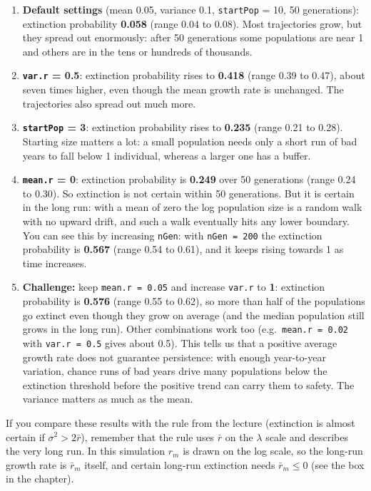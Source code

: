 \documentclass[
  a4paper]{book}
\providecommand{\tightlist}{%
  \setlength{\itemsep}{0pt}\setlength{\parskip}{0pt}}
\begin{document}
\begin{enumerate}
\def\labelenumi{\arabic{enumi}.}
\tightlist
\item
  \textbf{Default settings} (mean 0.05, variance 0.1, \texttt{startPop} = 10, 50 generations): extinction probability \textbf{0.058} (range 0.04 to 0.08). Most trajectories grow, but they spread out enormously: after 50 generations some populations are near 1 and others are in the tens or hundreds of thousands.
\item
  \textbf{\texttt{var.r} = 0.5}: extinction probability rises to \textbf{0.418} (range 0.39 to 0.47), about seven times higher, even though the mean growth rate is unchanged. The trajectories also spread out much more.
\item
  \textbf{\texttt{startPop} = 3}: extinction probability rises to \textbf{0.235} (range 0.21 to 0.28). Starting size matters a lot: a small population needs only a short run of bad years to fall below 1 individual, whereas a larger one has a buffer.
\item
  \textbf{\texttt{mean.r} = 0}: extinction probability is \textbf{0.249} over 50 generations (range 0.24 to 0.30). So extinction is not certain within 50 generations. But it is certain in the long run: with a mean of zero the log population size is a random walk with no upward drift, and such a walk eventually hits any lower boundary. You can see this by increasing \texttt{nGen}: with \texttt{nGen\ =\ 200} the extinction probability is \textbf{0.567} (range 0.54 to 0.61), and it keeps rising towards 1 as time increases.
\item
  \textbf{Challenge:} keep \texttt{mean.r\ =\ 0.05} and increase \texttt{var.r} to \textbf{1}: extinction probability is \textbf{0.576} (range 0.55 to 0.62), so more than half of the populations go extinct even though they grow on average (and the median population still grows in the long run). Other combinations work too (e.g.~\texttt{mean.r\ =\ 0.02} with \texttt{var.r\ =\ 0.5} gives about 0.5). This tells us that a positive average growth rate does not guarantee persistence: with enough year-to-year variation, chance runs of bad years drive many populations below the extinction threshold before the positive trend can carry them to safety. The variance matters as much as the mean.
\end{enumerate}

If you compare these results with the rule from the lecture (extinction is almost certain if \(\sigma^2 > 2\bar{r}\)), remember that the rule uses \(\bar{r}\) on the \(\lambda\) scale and describes the very long run. In this simulation \(r_m\) is drawn on the log scale, so the long-run growth rate is \(\bar{r}_m\) itself, and certain long-run extinction needs \(\bar{r}_m \leq 0\) (see the box in the chapter).
\end{document}
